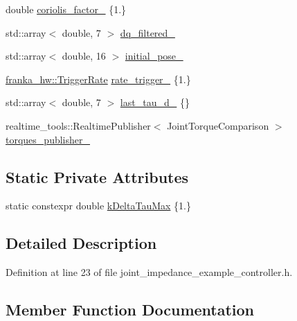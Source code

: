 \begin{DoxyCompactItemize}
double \hyperlink{classfranka__example__controllers_1_1JointImpedanceExampleController_ae00b8cb710e3a41bc7cc1b1060f52d9e}{coriolis\+\_\+factor\+\_\+} \{1.\}
\item 
std\+::array$<$ double, 7 $>$ \hyperlink{classfranka__example__controllers_1_1JointImpedanceExampleController_a003bd809f7a92fdf81bd63c57f414cf2}{dq\+\_\+filtered\+\_\+}
\item 
std\+::array$<$ double, 16 $>$ \hyperlink{classfranka__example__controllers_1_1JointImpedanceExampleController_ae5c009114b631bc41b1e91cf5603013c}{initial\+\_\+pose\+\_\+}
\item 
\hyperlink{classfranka__hw_1_1TriggerRate}{franka\+\_\+hw\+::\+Trigger\+Rate} \hyperlink{classfranka__example__controllers_1_1JointImpedanceExampleController_afd6d8f3ae121ae1251c5053557f242a3}{rate\+\_\+trigger\+\_\+} \{1.\}
\item 
std\+::array$<$ double, 7 $>$ \hyperlink{classfranka__example__controllers_1_1JointImpedanceExampleController_a2dfeef688b321513975733e45d387bdb}{last\+\_\+tau\+\_\+d\+\_\+} \{\}
\item 
realtime\+\_\+tools\+::\+Realtime\+Publisher$<$ Joint\+Torque\+Comparison $>$ \hyperlink{classfranka__example__controllers_1_1JointImpedanceExampleController_a7853d80a8b3a142be8825e895a70d20d}{torques\+\_\+publisher\+\_\+}
\end{DoxyCompactItemize}
\subsection*{Static Private Attributes}
\begin{DoxyCompactItemize}
\item 
static constexpr double \hyperlink{classfranka__example__controllers_1_1JointImpedanceExampleController_a0dc22a8d2121a79f7583444207cb724d}{k\+Delta\+Tau\+Max} \{1.\}
\end{DoxyCompactItemize}


\subsection{Detailed Description}


Definition at line 23 of file joint\+\_\+impedance\+\_\+example\+\_\+controller.\+h.



\subsection{Member Function Documentation}
\mbox{\label{classfranka__example__controllers_1_1JointImpedanceExampleController_a8163440bff59a3067be1d47e4b3c3c84}} 
